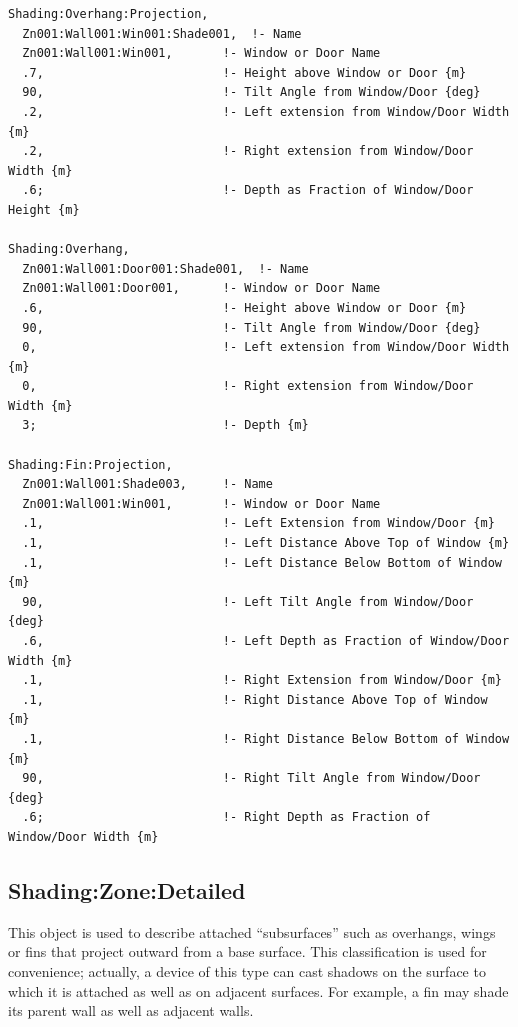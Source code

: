 \begin{lstlisting}
Shading:Overhang:Projection,
  Zn001:Wall001:Win001:Shade001,  !- Name
  Zn001:Wall001:Win001,       !- Window or Door Name
  .7,                         !- Height above Window or Door {m}
  90,                         !- Tilt Angle from Window/Door {deg}
  .2,                         !- Left extension from Window/Door Width {m}
  .2,                         !- Right extension from Window/Door Width {m}
  .6;                         !- Depth as Fraction of Window/Door Height {m}

Shading:Overhang,
  Zn001:Wall001:Door001:Shade001,  !- Name
  Zn001:Wall001:Door001,      !- Window or Door Name
  .6,                         !- Height above Window or Door {m}
  90,                         !- Tilt Angle from Window/Door {deg}
  0,                          !- Left extension from Window/Door Width {m}
  0,                          !- Right extension from Window/Door Width {m}
  3;                          !- Depth {m}

Shading:Fin:Projection,
  Zn001:Wall001:Shade003,     !- Name
  Zn001:Wall001:Win001,       !- Window or Door Name
  .1,                         !- Left Extension from Window/Door {m}
  .1,                         !- Left Distance Above Top of Window {m}
  .1,                         !- Left Distance Below Bottom of Window {m}
  90,                         !- Left Tilt Angle from Window/Door {deg}
  .6,                         !- Left Depth as Fraction of Window/Door Width {m}
  .1,                         !- Right Extension from Window/Door {m}
  .1,                         !- Right Distance Above Top of Window {m}
  .1,                         !- Right Distance Below Bottom of Window {m}
  90,                         !- Right Tilt Angle from Window/Door {deg}
  .6;                         !- Right Depth as Fraction of Window/Door Width {m}
\end{lstlisting}

\subsection{Shading:Zone:Detailed}\label{shadingzonedetailed-000}

This object is used to describe attached ``subsurfaces'' such as overhangs, wings or fins that project outward from a base surface. This classification is used for convenience; actually, a device of this type can cast shadows on the surface to which it is attached as well as on adjacent surfaces. For example, a fin may shade its parent wall as well as adjacent walls.

